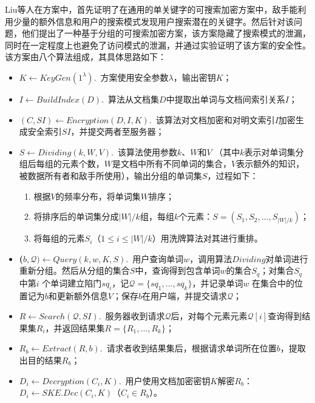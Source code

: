 Liu等人在方案\cite{liu2014search}中，首先证明了在通用的单关键字的可搜索加密方案中，敌手能利用少量的额外信息和用户的搜索模式发现用户搜索潜在的关键字。然后针对该问题，他们提出了一种基于分组的可搜索加密方案，该方案隐藏了搜索模式的泄漏，同时在一定程度上也避免了访问模式的泄漏，并通过实验证明了该方案的安全性。该方案由八个算法组成，其具体思路如下：
\begin{itemize}
  \item \textbf{$K \leftarrow KeyGen(1^\lambda).$}\ 方案使用安全参数$\lambda$，输出密钥$K$；

  \item \textbf{$I \leftarrow BuildIndex(D).$}\ 算法从文档集$D$中提取出单词与文档间索引关系$I$；

  \item \textbf{$(C, SI) \leftarrow Encryption(D,I,K).$}\ 该算法对文档加密和对明文索引$I$加密生成安全索引$SI$，并提交两者至服务器；

  \item \textbf{$S \leftarrow Dividing(k, W, V).$}\ 该算法使用参数$k$、$W$和$V$ （其中$k$表示对单词集分组后每组的元素个数，$W$是文档中所有不同单词的集合，$V$表示额外的知识，被数据所有者和敌手所使用），输出分组的单词集$S$，过程如下：
      \begin{enumerate}
        \item 根据$V$的频率分布，将单词集$W$排序；
        \item 将排序后的单词集分成$|W|/k$组，每组$k$个元素：$S = (S_1, S_2, ...,S_{|W|/k})$；
        \item 将每组的元素$S_i$（$1 \leq i \leq |W|/k$）用洗牌算法对其进行重排。
      \end{enumerate}

  \item \textbf{($b, \mathcal{Q}) \leftarrow Query(k, w, K, S).$}\ 用户查询单词$w$，调用算法$Dividing$对单词进行重新分组。然后从分组的集合$S$中，查询得到包含单词$w$的集合$S_q$；对集合$S_q$ 中第$i$ 个单词建立陷门$sq_i$，记$\mathcal{Q} = \{sq_1, ..., sq_k\}$，并记录单词$w$ 在集合中的位置记为$b$和更新额外信息$V$；保存$b$在用户端，并提交请求$\mathcal{Q}$；

  \item \textbf{$R \leftarrow Search(\mathcal{Q}, SI).$}\  服务器收到请求$\mathcal{Q}$后，对每个元素元素$\mathcal{Q}[i]$查询得到结果集$R_i$，并返回结果集$R = \{ R_1, ..., R_k \}$；

  \item \textbf{$R_b \leftarrow Extract(R,b).$}\ 请求者收到结果集后，根据请求单词所在位置$b$，提取出目的结果$R_b$；

  \item \textbf{$D_i \leftarrow Decryption(C_i, K).$}\ 用户使用文档加密密钥$K$解密$R_b$：$D_i \leftarrow SKE.Dec(C_i, K)$（$C_i \in R_b$）。

\end{itemize}

